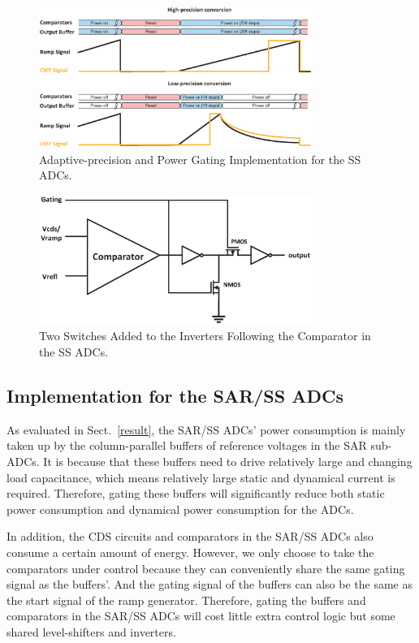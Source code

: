 \begin{figure}[htbp]
	\centerline{\includegraphics[width=3.5in]{./Figures/SS_pg.eps}}
	\caption{Adaptive-precision and Power Gating Implementation for the SS ADCs.}
	\label{SS_pg}
\end{figure} 

\begin{figure}[htbp]
	\centerline{\includegraphics[width=3.5in]{./Figures/MATE.eps}}
	\caption{Two Switches Added to the Inverters Following the Comparator in the SS ADCs.}
	\label{MATE}
\end{figure} 

\subsection{Implementation for the SAR/SS ADCs}

As evaluated in Sect.~\ref{result}, the SAR/SS ADCs’ power consumption is mainly taken up by the column-parallel buffers of reference voltages in the SAR sub-ADCs.
It is because that these buffers need to drive relatively large and changing load capacitance, which means relatively large static and dynamical current is required.
Therefore, gating these buffers will significantly reduce both static power consumption and dynamical power consumption for the ADCs.

In addition, the CDS circuits and comparators in the SAR/SS ADCs also consume a certain amount of energy. However, we only choose to take the comparators under control because they can conveniently share the same gating signal as the buffers'. And the gating signal of the buffers can also be the same as the start signal of the ramp generator. Therefore, gating the buffers and comparators in the SAR/SS ADCs will cost little extra control logic but some shared level-shifters and inverters.

